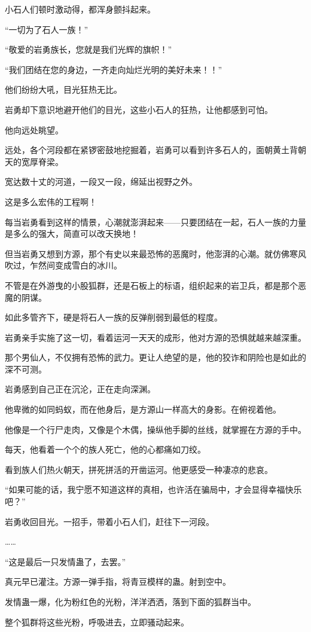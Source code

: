 \begin{this_body}
小石人们顿时激动得，都浑身颤抖起来。

“一切为了石人一族！”

“敬爱的岩勇族长，您就是我们光辉的旗帜！”

“我们团结在您的身边，一齐走向灿烂光明的美好未来！！”

他们纷纷大吼，目光狂热无比。

岩勇却下意识地避开他们的目光，这些小石人的狂热，让他都感到可怕。

他向远处眺望。

远处，各个河段都在紧锣密鼓地挖掘着，岩勇可以看到许多石人的，面朝黄土背朝天的宽厚脊梁。

宽达数十丈的河道，一段又一段，绵延出视野之外。

这是多么宏伟的工程啊！

每当岩勇看到这样的情景，心潮就澎湃起来——只要团结在一起，石人一族的力量是多么的强大，简直可以改天换地！

但当岩勇又想到方源，那个有史以来最恐怖的恶魔时，他澎湃的心潮。就仿佛寒风吹过，乍然间变成雪白的冰川。

不管是在外游曳的小股狐群，还是石板上的标语，组织起来的岩卫兵，都是那个恶魔的阴谋。

如此多管齐下，硬是将石人一族的反弹削弱到最低的程度。

岩勇亲手实施了这一切，看着运河一天天的成形，他对方源的恐惧就越来越深重。

那个男仙人，不仅拥有恐怖的武力。更让人绝望的是，他的狡诈和阴险也是如此的深不可测。

岩勇感到自己正在沉沦，正在走向深渊。

他卑微的如同蚂蚁，而在他身后，是方源山一样高大的身影。在俯视着他。

他像是一个行尸走肉，又像是个木偶，操纵他手脚的丝线，就掌握在方源的手中。

每天，他看着一个个的族人死亡，他的心都痛如刀绞。

看到族人们热火朝天，拼死拼活的开凿运河。他更感受一种凄凉的悲哀。

“如果可能的话，我宁愿不知道这样的真相，也许活在骗局中，才会显得幸福快乐吧？”

岩勇收回目光。一招手，带着小石人们，赶往下一河段。

……

“这是最后一只发情蛊了，去罢。”

真元早已灌注。方源一弹手指，将青豆模样的蛊。射到空中。

发情蛊一爆，化为粉红色的光粉，洋洋洒洒，落到下面的狐群当中。

整个狐群将这些光粉，呼吸进去，立即骚动起来。


\end{this_body}

